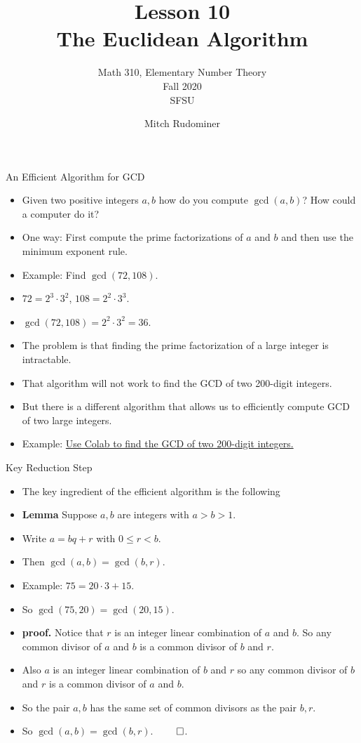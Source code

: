 \documentclass{beamer}
\title{Lesson 10 \\ The Euclidean Algorithm}
\subtitle{Math 310, Elementary Number Theory \\ Fall 2020 \\ SFSU}
\author{Mitch Rudominer}
\date{}
\begin{document}
\begin{frame}
  \titlepage
\end{frame}

\begin{frame}{An Efficient Algorithm for GCD}

\begin{itemize}
  \item Given two positive integers $a,b$ how do you compute $\gcd(a,b)$? How could a computer do it?
  \item One way: First compute the prime factorizations of $a$ and $b$ and then use the minimum exponent rule.
  \item Example: Find $\gcd(72, 108)$.
  \item $72=2^3\cdot 3^2$, $108=2^2\cdot 3^3$.
  \item $\gcd(72,108) = 2^2\cdot 3^2 = 36$.
  \item The problem is that finding the prime factorization of a large integer is intractable.
  \item That algorithm will not work to find the GCD of two 200-digit integers.
  \item But there is a different algorithm that allows us to efficiently compute GCD of two large integers.
  \item Example: \href{https://colab.research.google.com/drive/1itrO4ePMS6PxUmBhbTBumrgoafyIglD7}{Use Colab to find the GCD of two 200-digit integers.}
\end{itemize}

\end{frame}

\begin{frame}{Key Reduction Step}

\begin{itemize}
  \item The key ingredient of the efficient algorithm is the following
  \item \textbf{Lemma} Suppose $a,b$ are integers with $a>b>1$.
  \item Write $a = bq + r$ with $0\leq r < b$.
  \item Then $\gcd(a,b) = \gcd(b,r)$.
  \item Example: $75 = 20\cdot 3 + 15$.
  \item So $\gcd(75, 20) = \gcd(20, 15)$.
  \item \textbf{proof.} Notice that $r$ is an integer linear combination of
  $a$ and $b$. So any common divisor of $a$ and $b$ is a common divisor of $b$ and $r$.
  \item Also $a$ is an integer linear combination of $b$ and $r$ so any common divisor
  of $b$ and $r$ is a common divisor of $a$ and $b$.
  \item So the pair $a,b$ has the same set of common divisors as the pair $b,r$.
  \item So $\gcd(a,b)=\gcd(b,r)$. $\qed$.
\end{itemize}

\end{frame}
\end{document}
